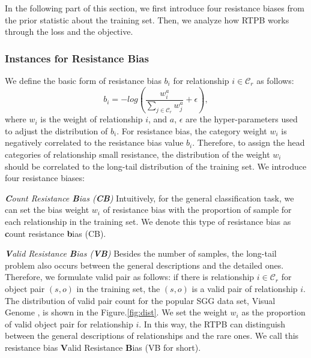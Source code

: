 In the following part of this section, 
we first introduce four resistance biases from the prior statistic about the training set. Then, we analyze how RTPB works through the loss and the objective.
\subsubsection{Instances for Resistance Bias}
\par We define the basic form of resistance bias $b_i$ for relationship $i \in \mathcal{C}_r$ as follows:
\begin{equation}
	b_i = -log \left(\frac{w_i^{a}}{\sum_{j \in \mathcal{C}_r} w_j^a}+ \epsilon\right),
	\label{eq:bias}
\end{equation}
where $w_i$ is the weight of relationship $i$, and $a$, $ \epsilon$ are the hyper-parameters used to adjust the distribution of $b_i$. For resistance bias, the category weight $w_i$ is negatively correlated to the  resistance bias value $b_i$. Therefore, to assign the head categories of relationship small resistance, the distribution of the weight $w_i$ should be correlated to the long-tail distribution of the training set. We introduce four resistance biases:



\textit{\textbf{C}ount Resistance \textbf{B}ias (\textbf{CB})} Intuitively, for the general classification task, we can set the bias weight $w_i$ of resistance bias with the proportion of sample for each relationship in the training set. We denote this type of resistance bias as \textbf{c}ount resistance \textbf{b}ias (CB).  

\textit{\textbf{V}alid Resistance \textbf{B}ias (\textbf{VB})} 
Besides the number of samples, the long-tail problem also occurs between the general descriptions and the detailed ones. 
Therefore, we formulate valid pair as follows: 
if there is relationship $i\in \mathcal{C}_r$ for object pair $(s,o)$ in the training set, the $(s,o)$ is a valid pair of relationship $i$. 
The distribution of valid pair count for the popular SGG data set, Visual Genome \cite{krishna2016visual}, is shown in the Figure.\ref{fig:dist}. We set the weight $w_{i}$ as the proportion of valid object pair for relationship $i$. In this way, the RTPB can distinguish between the general descriptions of relationships and the rare ones. We call this resistance bias \textbf{V}alid Resistance \textbf{B}ias (VB for short).

